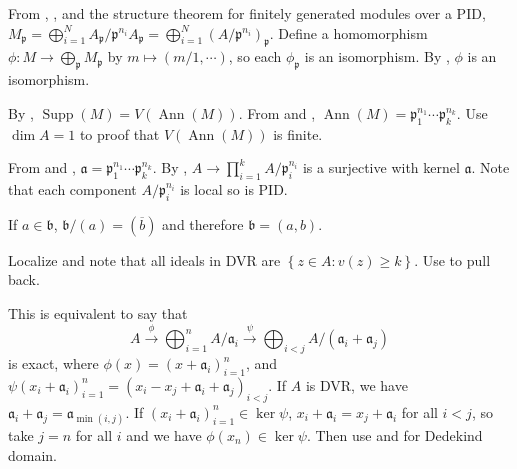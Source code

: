 \begin{exercise}\label{ex9.6}
	From , , and the structure theorem for finitely generated modules over a PID, $M_\mathfrak{p}=\bigoplus_{i=1}^NA_\mathfrak{p}/\mathfrak{p}^{n_i}A_\mathfrak{p}=\bigoplus_{i=1}^N\left(A/\mathfrak{p}^{n_i}\right)_\mathfrak{p}$. Define a homomorphism $\phi:M\rightarrow\bigoplus_\mathfrak{p}M_\mathfrak{p}$ by $m\mapsto(m/1,\cdots)$, so each $\phi_\mathfrak{p}$ is an isomorphism. By , $\phi$ is an isomorphism.
	
	By , $\operatorname{Supp}(M)=V(\operatorname{Ann}(M))$. From  and , $\operatorname{Ann}(M)=\mathfrak{p}_1^{n_1}\cdots\mathfrak{p}_k^{n_k}$. Use $\dim A=1$ to proof that $V(\operatorname{Ann}(M))$ is finite.
\end{exercise}

\begin{exercise}\label{ex9.7}
	From  and , $\mathfrak{a}=\mathfrak{p}_1^{n_1}\cdots\mathfrak{p}_k^{n_k}$. By , $A\rightarrow\prod_{i=1}^{k}A/\mathfrak{p}_i^{n_i}$ is a surjective with kernel $\mathfrak{a}$. Note that each component $A/\mathfrak{p}_i^{n_i}$ is local so is PID.
	
	If $a\in\mathfrak{b}$, $\mathfrak{b}/(a)=(\overline{b})$ and therefore $\mathfrak{b}=(a,b)$.
\end{exercise}

\begin{exercise}\label{ex9.8}
	Localize and note that all ideals in DVR are $\left\{z\in A:v(z)\geqslant k\right\}$. Use  to pull back.
\end{exercise}

\begin{exercise}\label{ex9.9}
	This is equivalent to say that
	\begin{equation*}
		A\xrightarrow{\phi}\bigoplus_{i=1}^nA/\mathfrak{a}_i\xrightarrow{\psi}\bigoplus_{i<j}A/\left(\mathfrak{a}_i+\mathfrak{a}_j\right)
	\end{equation*}
	is exact, where $\phi(x)=\left(x+\mathfrak{a}_i\right)_{i=1}^n$, and $\psi\left(x_i+\mathfrak{a}_i\right)_{i=1}^n=\left(x_i-x_j+\mathfrak{a}_i+\mathfrak{a}_j\right)_{i<j}$. If $A$ is DVR, we have $\mathfrak{a}_i+\mathfrak{a}_j=\mathfrak{a}_{\min(i,j)}$. If $\left(x_i+\mathfrak{a}_i\right)_{i=1}^n\in\ker\psi$, $x_i+\mathfrak{a}_i=x_j+\mathfrak{a}_i$ for all $i<j$, so take $j=n$ for all $i$ and we have $\phi\left(x_n\right)\in\ker\psi$. Then use  and  for Dedekind domain.
\end{exercise}